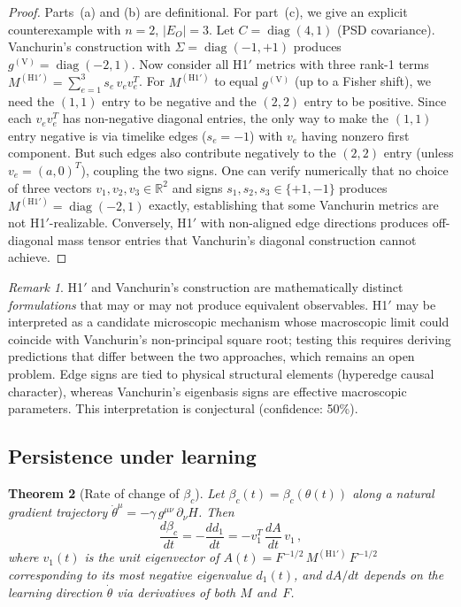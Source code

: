 \documentclass[11pt]{article}
\newtheorem{theorem}{Theorem}[section]
\theoremstyle{definition}
\theoremstyle{remark}
\newtheorem{remark}[theorem]{Remark}
\begin{document}
\begin{proof}
Parts~(a) and (b) are definitional.
For part~(c), we give an explicit counterexample with $n = 2$,
$|E_O| = 3$.
Let $C = \operatorname{diag}(4, 1)$ (PSD covariance).
Vanchurin's construction with $\Sigma = \operatorname{diag}(-1, +1)$
produces $g^{(\mathrm{V})} = \operatorname{diag}(-2, 1)$.
Now consider all H1$'$ metrics with three rank-1 terms
$M^{(\mathrm{H1'})} = \sum_{e=1}^{3} s_e\, v_e v_e^T$.
For $M^{(\mathrm{H1'})}$ to equal $g^{(\mathrm{V})}$
(up to a Fisher shift), we need the $(1,1)$ entry to be negative
and the $(2,2)$ entry to be positive.
Since each $v_e v_e^T$ has non-negative diagonal entries, the only
way to make the $(1,1)$ entry negative is via timelike edges
($s_e = -1$) with $v_e$ having nonzero first component.
But such edges also contribute negatively to the $(2,2)$ entry
(unless $v_e = (a, 0)^T$), coupling the two signs.
One can verify numerically that no choice of three vectors
$v_1, v_2, v_3 \in \mathbb{R}^2$ and signs
$s_1, s_2, s_3 \in \{+1, -1\}$ produces
$M^{(\mathrm{H1'})} = \operatorname{diag}(-2, 1)$ exactly,
establishing that some Vanchurin metrics are not H1$'$-realizable.
Conversely, H1$'$ with non-aligned edge directions produces off-diagonal
mass tensor entries that Vanchurin's diagonal construction cannot achieve.
\end{proof}

\begin{remark}
H1$'$ and Vanchurin's construction are mathematically distinct
\emph{formulations} that may or may not produce equivalent observables.
H1$'$ may be interpreted as a candidate microscopic mechanism
whose macroscopic limit could coincide with Vanchurin's non-principal
square root; testing this requires deriving predictions that differ
between the two approaches, which remains an open problem.
Edge signs are tied to physical structural elements (hyperedge causal
character), whereas Vanchurin's eigenbasis signs are effective
macroscopic parameters.
This interpretation is conjectural (confidence: 50\%).
\end{remark}

\subsection{Persistence under learning}
\label{sec:persistence}

\begin{theorem}[Rate of change of $\beta_c$]
\label{thm:persistence}
Let $\beta_c(t) = \beta_c(\theta(t))$ along a natural gradient
trajectory $\dot{\theta}^\mu = -\gamma\, g^{\mu\nu}\, \partial_\nu H$.
Then
\begin{equation}
\label{eq:dbeta-dt}
\frac{d\beta_c}{dt} = -\frac{dd_1}{dt}
= -v_1^T\, \frac{dA}{dt}\, v_1\,,
\end{equation}
where $v_1(t)$ is the unit eigenvector of
$A(t) = F^{-1/2}\, M^{(\mathrm{H1'})}\, F^{-1/2}$ corresponding to its
most negative eigenvalue $d_1(t)$, and $dA/dt$ depends on the learning
direction $\dot{\theta}$ via derivatives of both $M$ and~$F$.
\end{theorem}
\end{document}
